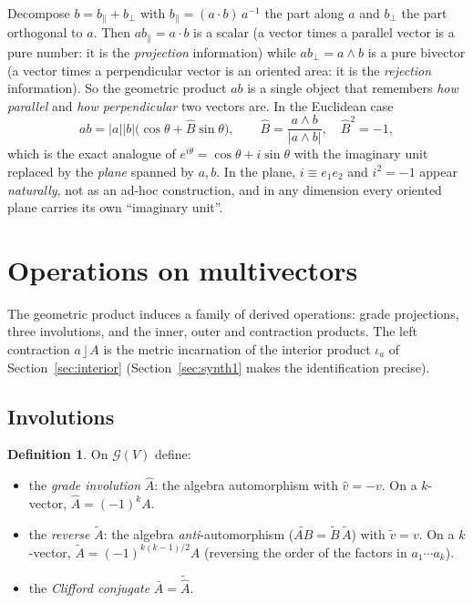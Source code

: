 \documentclass[11pt,a4paper]{article}
\newcounter{thm}[section]
\numberwithin{equation}{section}
\theoremstyle{definition}
\newtheorem{definition}[thm]{Definition}
\theoremstyle{plain}
\newcommand{\GA}{\mathcal{G}}
\newcommand{\rev}[1]{\widetilde{#1}}
\newcommand{\lc}{\mathbin{\rfloor}}
\begin{document}
\begin{intuition}
Decompose $b=b_\parallel+b_\perp$ with $b_\parallel=(a\cdot b)\,a^{-1}$ the part along $a$ and $b_\perp$ the part orthogonal to $a$.
Then $ab_\parallel=a\cdot b$ is a scalar (a vector times a parallel vector is a pure number: it is the \emph{projection} information) while
$ab_\perp=a\wedge b$ is a pure bivector (a vector times a perpendicular vector is an oriented area: it is the \emph{rejection} information).
So the geometric product $ab$ is a single object that remembers \emph{how parallel} and \emph{how perpendicular} two vectors are.
In the Euclidean case
\[
 ab=|a||b|\bigl(\cos\theta+\hat B\sin\theta\bigr),\qquad \hat B=\frac{a\wedge b}{|a\wedge b|},\quad \hat B^2=-1,
\]
which is the exact analogue of $e^{i\theta}=\cos\theta+i\sin\theta$ with the imaginary unit replaced by the \emph{plane} spanned by $a,b$.
In the plane, $i\equiv e_1e_2$ and $i^2=-1$ appear \emph{naturally}, not as an ad-hoc construction, and in any dimension every oriented plane carries its own ``imaginary unit''.
\end{intuition}



\section{Operations on multivectors}\label{sec:ops}

The geometric product induces a family of derived operations: grade projections, three involutions, and the inner, outer and
contraction products. The left contraction $a\lc A$ is the metric incarnation of the interior product $\iota_a$ of
Section~\ref{sec:interior} (Section~\ref{sec:synth1} makes the identification precise).

\subsection{Involutions}

\begin{definition}
On $\GA(V)$ define:
\begin{itemize}
  \item the \emph{grade involution} $\hat A$: the algebra automorphism with $\hat v=-v$. On a $k$-vector, $\hat A=(-1)^kA$.
  \item the \emph{reverse} $\rev A$: the algebra \emph{anti}-automorphism ($\rev{AB}=\rev B\,\rev A$) with $\rev v=v$. On a $k$-vector, $\rev A=(-1)^{k(k-1)/2}A$ (reversing the order of the factors in $a_1\cdots a_k$).
  \item the \emph{Clifford conjugate} $\bar A=\rev{\hat A}$.
\end{itemize}
\end{definition}
\end{document}
